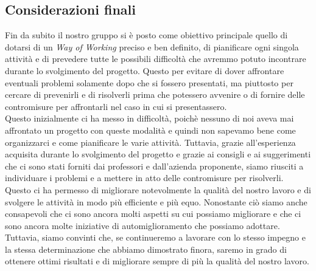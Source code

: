 \subsection{Considerazioni finali}
Fin da subito il nostro gruppo si è posto come obiettivo principale quello di dotarsi di un \textit{Way of Working} preciso e ben definito, di pianificare ogni singola attività e di prevedere tutte le possibili difficoltà che avremmo potuto incontrare durante lo svolgimento del progetto. Questo per evitare di dover affrontare eventuali problemi solamente dopo che si fossero presentati, ma piuttosto per cercare di prevenirli e di risolverli prima che potessero avvenire o di fornire delle contromisure per affrontarli nel caso in cui si presentassero. \\
Questo inizialmente ci ha messo in difficoltà, poichè nessuno di noi aveva mai affrontato un progetto con queste modalità e quindi non sapevamo bene come organizzarci e come pianificare le varie attività. Tuttavia, grazie all'esperienza acquisita durante lo svolgimento del progetto e grazie ai consigli e ai suggerimenti che ci sono stati forniti dai professori e dall'azienda proponente, siamo riusciti a individuare i problemi e a mettere in atto delle contromisure per risolverli. \\
Questo ci ha permesso di migliorare notevolmente la qualità del nostro lavoro e di svolgere le attività in modo più efficiente e più equo. Nonostante ciò siamo anche consapevoli che ci sono ancora molti aspetti su cui possiamo migliorare e che ci sono ancora molte iniziative di automiglioramento che possiamo adottare. Tuttavia, siamo convinti che, se continueremo a lavorare con lo stesso impegno e la stessa determinazione che abbiamo dimostrato finora, saremo in grado di ottenere ottimi risultati e di migliorare sempre di più la qualità del nostro lavoro.